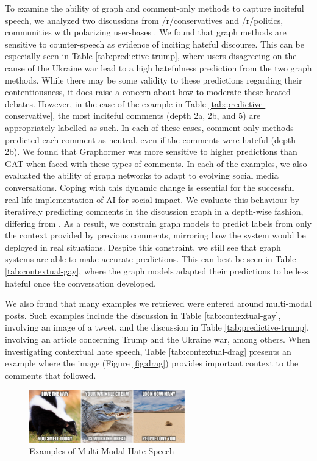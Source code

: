 \documentclass[letterpaper]{article} %
\begin{document}
To examine the ability of graph and comment-only methods to capture inciteful speech, we analyzed two discussions from /r/conservatives and /r/politics, communities with polarizing user-bases \cite{Waller2021}. We found that graph methods are sensitive to counter-speech as evidence of inciting hateful discourse. This can be especially seen in Table \ref{tab:predictive-trump}, where users disagreeing on the cause of the Ukraine war lead to a high hatefulness prediction from the two graph methods. While there may be some validity to these predictions regarding their contentiousness, it does raise a concern about how to moderate these heated debates.
However, in the case of the example in Table \ref{tab:predictive-conservative}, the most inciteful comments (depth 2a, 2b, and 5) are appropriately labelled as such. In each of these cases, comment-only methods predicted each comment as neutral, even if the comments were hateful (depth 2b). We found that Graphormer was more sensitive to higher predictions than GAT when faced with these types of comments.  In each of the examples, we also evaluated the ability of graph networks to adapt to evolving social media conversations. Coping with this dynamic change is essential for the successful real-life implementation of AI for social impact. We evaluate this behaviour by iteratively predicting comments in the discussion graph in a depth-wise fashion, differing from \citet{hebert2022predicting}. As a result, we constrain graph models to predict labels from only the context provided by previous comments, mirroring how the system would be deployed in real situations. Despite this constraint, we still see that graph systems are able to make accurate predictions. This can best be seen in Table \ref{tab:contextual-gay}, where the graph models adapted their predictions to be less hateful once the conversation developed.

We also found that many examples we retrieved were entered around multi-modal posts. Such examples include the discussion in Table \ref{tab:contextual-gay}, involving an image of a tweet, and the discussion in Table \ref{tab:predictive-trump}, involving an article concerning Trump and the Ukraine war, among others. When investigating contextual hate speech, Table \ref{tab:contextual-drag} presents an example where the image (Figure \ref{fig:drag}) provides important context to the comments that followed.

\begin{figure}
\centering
\includegraphics[width=0.8\linewidth,height=0.9in ]{hatefulmemes.png}
\caption{Examples of Multi-Modal Hate Speech}
\label{fig:multimodal}
\end{figure}
\end{document}
